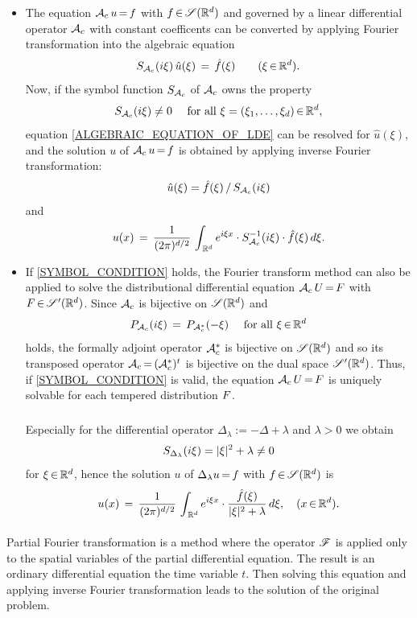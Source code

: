 \documentclass[11pt,twoside]{article}
\begin{document}
\begin{itemize}[leftmargin=4mm]
\item[1.]
The equation ${\mathcal{A}}_c \, u {\,=\,} f$ with $f {\,\in\,} \mathscr{S}({\mathbb{R}}^d)$
and governed by a linear differential operator ${\mathcal{A}}_c$
with constant coefficents
can be converted by applying Fourier transformation
into the algebraic equation
\begin{equation}\label{ALGEBRAIC_EQUATION_OF_LDE}
S_{{\mathcal{A}}_c}(i \xi) \, \hat{u}(\xi) \,=\, \hat{f}(\xi)
\quad \quad (\xi {\,\in\,} {\mathbb{R}}^d).
\end{equation}
Now,
if the symbol function $S_{{\mathcal{A}}_c}$ of ${\mathcal{A}}_c$ owns the property
\begin{equation}\label{SYMBOL_CONDITION}
S_{{\mathcal{A}}_c}(i \xi) \neq 0
\quad \mbox{ for all } \xi = (\xi_1,\ldots,\xi_d) {\,\in\,} {\mathbb{R}}^d,
\end{equation}
equation \eqref{ALGEBRAIC_EQUATION_OF_LDE} can be resolved for $\hat{u}(\xi)$,
and the solution $u$ of ${\mathcal{A}}_c \,u {\,=\,} f$
is obtained by applying inverse Fourier transformation:
\[
\hat{u}(\xi) = \hat{f}(\xi) \, / \, S_{{\mathcal{A}}_c}(i \xi)
\]
and
\[
u(x) \,=\, \frac{1}{(2 \pi)^{d/2}} \,
\int_{\,{\mathbb{R}}^d}
e^{i \xi x} \cdot S_{{\mathcal{A}}_c}^{-1}(i \xi) \cdot \hat{f}(\xi) \, d \xi.
\]

\item[2.]
If \eqref{SYMBOL_CONDITION} holds,
the Fourier transform method can also be applied
to solve the distributional differential equation
${\mathcal{A}}_c \, U {\,=\,} F$ with $F {\,\in\,} \mathscr{S}'({\mathbb{R}}^d)$.
Since ${\mathcal{A}}_c$ is bijective on $\mathscr{S}({\mathbb{R}}^d)$ and 
\[
P_{{\mathcal{A}}_c}(i \xi) \,=\, P_{{\mathcal{A}}_c^*}(-\xi)
\quad \mbox{ for all } \xi {\,\in\,} {\mathbb{R}}^d
\]
holds,
the formally adjoint operator ${\mathcal{A}}_c^*$
is bijective on $\mathscr{S}({\mathbb{R}}^d)$ and so its transposed operator
${\mathcal{A}}_c {\,=\,} ({\mathcal{A}}_c^*)^t$ is bijective on the dual space $\mathscr{S}'({\mathbb{R}}^d)$.
Thus,
if \eqref{SYMBOL_CONDITION} is valid,
the equation ${\mathcal{A}}_c \, U {\,=\,} F$
is uniquely solvable for each tempered distribution $F$.

\subparagraph{}
Especially for the differential operator 
$\Delta{_\lambda} := -\Delta + \lambda$ and $\lambda > 0$ we obtain
\[
S_{\Delta_{\lambda}}(i \xi) = \abs{\xi} ^2 + \lambda \neq 0
\]
for $\xi {\,\in\,} {\mathbb{R}}^d$,
hence the solution $u$ of $\Delta_{\lambda} u {\,=\,} f$ with $f {\,\in\,} \mathscr{S}({\mathbb{R}}^d)$ is
\[
u(x) \=
\frac{1}{(2 \pi)^{d/2}} \,
\int_{\,\Rd} e^{i \xi x}
\cdot \frac{\hat{f}(\xi)}{\abs{\xi} ^2 + \lambda} \, d \xi, \quad (x \xeof \Rd).
\]
\end{itemize}

\paragraph{} %
Partial Fourier transformation is a method
where the operator $\mathscr{F}$ is applied only to the spatial variables
of the partial differential equation.
The result is an ordinary differential equation
{\wrt} the time variable $t$.
Then solving this equation and applying inverse Fourier transformation
leads to the solution of the original problem.
\end{document}
